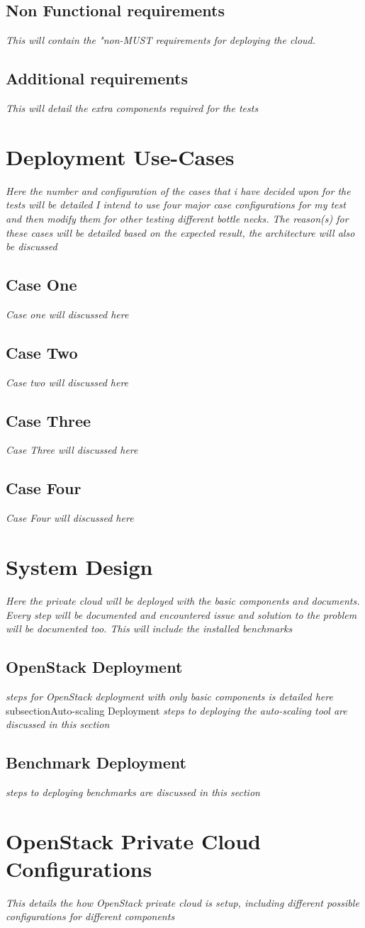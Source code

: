 \subsection{Non Functional requirements}
\textit{This will contain the "non-MUST requirements for deploying the cloud.}
\subsection{Additional requirements}
\textit{This will detail the extra components required for the tests}
\section{Deployment Use-Cases}
\textit{Here the number and configuration of the cases that i have decided upon for the tests will be detailed} \textit{I intend to use four major case configurations for my test and then modify them for other testing different bottle necks. The reason(s) for these cases will be detailed based on the expected result, the architecture will also be discussed}
\subsection{Case One}
\textit{Case one will discussed here}
\subsection{Case Two}
\textit{Case two will discussed here}
\subsection{Case Three}
\textit{Case Three will discussed here}
\subsection{Case Four}
\textit{Case Four will discussed here}
\section{System Design}
\textit{Here the private cloud will be deployed with the basic components and documents. Every step will be documented and encountered issue and solution to the problem will be documented too. This will include the installed benchmarks}
\subsection{OpenStack Deployment}
\textit{steps for OpenStack deployment with only basic components is detailed here}
subsection{Auto-scaling Deployment}
\textit{steps to deploying the auto-scaling tool are discussed in this section}
\subsection{Benchmark Deployment}
\textit{steps to deploying benchmarks are discussed in this section}
\section{OpenStack Private Cloud Configurations}
\textit{This details the how OpenStack private cloud is setup, including different possible configurations for different components}

